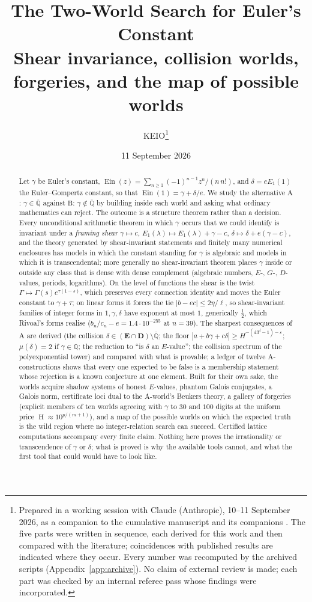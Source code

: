\documentclass[11pt,a4paper]{article}
\title{\bfseries The Two-World Search for Euler's Constant\\[6pt]
\large Shear invariance, collision worlds, forgeries, and the map of possible worlds}
\author{KEIO\thanks{Prepared in a working session with Claude (Anthropic), 10--11 September 2026,
as a companion to the cumulative manuscript \cite{M} and its companions \cite{K001,K002}.
The five parts were written in sequence, each derived for this work and then compared with
the literature; coincidences with published results are indicated where they occur. Every
number was recomputed by the archived scripts (Appendix~\ref{app:archive}). No claim of
external review is made; each part was checked by an internal referee pass whose findings
were incorporated.}}
\date{11 September 2026}
\newcommand{\Q}{\mathbb Q}
\newcommand{\Qbar}{\overline{\mathbb Q}}
\newcommand{\Ein}{\operatorname{Ein}}
\newcommand{\EE}{\mathbf E}
\newcommand{\DD}{\mathbf D}
\DeclareMathOperator{\Ht}{H}
\theoremstyle{definition}
\theoremstyle{remark}
\numberwithin{equation}{section}
\begin{document}
\maketitle

\begin{abstract}
Let $\gamma$ be Euler's constant, $\Ein(z)=\sum_{n\ge1}(-1)^{n-1}z^n/(n\,n!)$, and
$\delta=eE_1(1)$ the Euler--Gompertz constant, so that $\Ein(1)=\gamma+\delta/e$. We
study the alternative $\mathrm A$: $\gamma\in\Qbar$ against $\mathrm B$: $\gamma\notin\Qbar$
by building inside each world and asking what ordinary mathematics can reject. The
outcome is a structure theorem rather than a decision. Every unconditional arithmetic
theorem in which $\gamma$ occurs that we could identify is invariant under a
\emph{framing shear} $\gamma\mapsto c$, $E_1(\lambda)\mapsto E_1(\lambda)+\gamma-c$,
$\delta\mapsto\delta+e(\gamma-c)$, and the theory generated by shear-invariant statements
and finitely many numerical enclosures has models in which the constant standing for
$\gamma$ is algebraic and models in which it is transcendental; more generally no
shear-invariant theorem places $\gamma$ inside or outside any class that is dense with
dense complement (algebraic numbers, $E$-, $G$-, $D$-values, periods, logarithms). On the
level of functions the shear is the twist $\Gamma\mapsto\Gamma(s)e^{\tau(1-s)}$, which
preserves every connection identity and moves the Euler constant to $\gamma+\tau$; on
linear forms it forces the tie $|b-ec|\le2\eta/\ell$, so shear-invariant families of integer
forms in $1,\gamma,\delta$ have exponent at most $1$, generically $\tfrac12$, which
Rivoal's forms realise ($b_n/c_n-e=1.4\cdot10^{-255}$ at $n=39$). The sharpest consequences
of $\mathrm A$ are derived (the collision $\delta\in(\EE\cap\DD)\setminus\Qbar$; the floor
$|a+b\gamma+c\delta|\ge H^{-(d3^d-1)-\varepsilon}$; $\mu(\delta)=2$ if $\gamma\in\Q$; the
reduction to ``is $\delta$ an $E$-value''; the collision spectrum of the polyexponential
tower) and compared with what is provable; a ledger of twelve $\mathrm A$-constructions
shows that every one expected to be false is a membership statement whose rejection is a
known conjecture at one element. Built for their own sake, the worlds acquire shadow
systems of honest $E$-values, phantom Galois conjugates, a Galois norm, certificate loci
dual to the $\mathrm A$-world's Beukers theory, a gallery of forgeries (explicit members
of ten worlds agreeing with $\gamma$ to $30$ and $100$ digits at the uniform price
$\Ht\approx10^{p/(m+1)}$), and a map of the possible worlds on which the expected truth is
the wild region where no integer-relation search can succeed. Certified lattice
computations accompany every finite claim. Nothing here proves the irrationality or
transcendence of $\gamma$ or $\delta$; what is proved is why the available tools cannot,
and what the first tool that could would have to look like.
\end{abstract}
\end{document}

